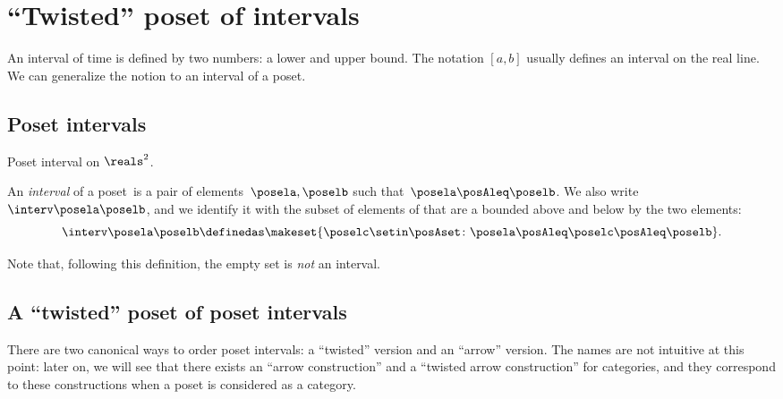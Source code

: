 
\section{``Twisted'' poset of intervals}

An interval of time is defined by two numbers: a lower and upper bound.
The notation $[a,b]$ usually defines an interval on the real line.
We can generalize the notion to an interval of a poset.

\subsection{Poset intervals}
\begin{marginfigure}
    \centering
    \caption{Poset interval on $\reals^2$.}
    \label{fig:int_posets}
\end{marginfigure}

\begin{definition}[Interval]
    \label{def:interval}
    An \emph{interval} of a poset~\posA is a pair of elements~$\posela, \poselb$ such that~$\posela \posAleq \poselb$.
    We also write $\interv \posela \poselb$, and we identify it with the subset of elements of \posA that are a bounded above and below by the two elements:
    \begin{equation}\label{eq:interval}
        \interv \posela \poselb
        \definedas
        \makeset{
            \poselc \setin \posAset \colon
            \posela \posAleq \poselc \posAleq \poselb
        }.
    \end{equation}
\end{definition}

Note that, following this definition, the empty set is \emph{not} an interval.

\subsection{A ``twisted'' poset of poset intervals}

There are two canonical ways to order poset intervals: a ``twisted'' version and an ``arrow'' version.
The names are not intuitive at this point: later on, we will see that there exists an ``arrow construction'' and a ``twisted arrow construction'' for categories, and they correspond to these constructions when a poset is considered as a category.

